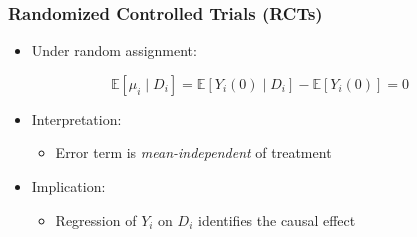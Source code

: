 \documentclass[12pt, compress]{beamer}
\begin{document}
\begin{frame}
	\frametitle{Randomized Controlled Trials (RCTs)}

\begin{itemize}
	\item Under random assignment:
\end{itemize}

\begin{equation*}
	\mathbb{E}[\mu_i \mid D_i] 
	= \mathbb{E}[Y_i(0) \mid D_i] - \mathbb{E}[Y_i(0)] 
	= 0
\end{equation*}

\begin{itemize}
	\item Interpretation:
	\begin{itemize}
		\item Error term is \textit{mean-independent} of treatment
	\end{itemize}
	
	\medskip
	
	\item Implication:
	\begin{itemize}
		\item Regression of $Y_i$ on $D_i$ identifies the causal effect
	\end{itemize}
\end{itemize}

\end{frame}
\end{document}
